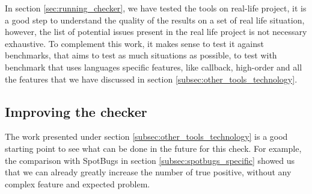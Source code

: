 In section \ref{sec:running_checker}, we have tested the tools on real-life project, it is a good step to understand the quality of the results on a set of real life situation, however, the list of potential issues present in the real life project is not necessary exhaustive. 
To complement this work, it makes sense to test it against benchmarks, that aims to test as much situations as possible, to test with benchmark that uses languages specific features, like callback, high-order and all the features that we have discussed in section \ref{subsec:other_tools_technology}.

\subsection{Improving the checker}
\label{subsec:other_tools}

The work presented under section \ref{subsec:other_tools_technology} is a good starting point to see what can be done in the future for this check. 
For example, the comparison with SpotBugs in section \ref{subsec:spotbugs_specific} showed us that we can already greatly increase the number of true positive, without any complex feature and expected problem.